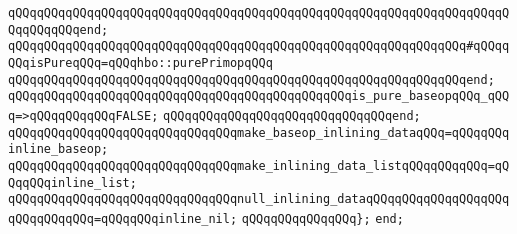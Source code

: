 \verb|qQQqqQQqqQQqqQQqqQQqqQQqqQQqqQQqqQQqqQQqqQQqqQQqqQQqqQQqqQQqqQQqqQQqqQQqqQQqqQQqend;|\newline
\newline
\verb|qQQqqQQqqQQqqQQqqQQqqQQqqQQqqQQqqQQqqQQqqQQqqQQqqQQqqQQqqQQqqQQq#qQQqqQQqisPureqQQq=qQQqhbo::purePrimopqQQq|\newline
\newline
\verb|qQQqqQQqqQQqqQQqqQQqqQQqqQQqqQQqqQQqqQQqqQQqqQQqqQQqqQQqqQQqqQQqend;|\newline
\newline
\verb|qQQqqQQqqQQqqQQqqQQqqQQqqQQqqQQqqQQqqQQqqQQqqQQqis_pure_baseopqQQq_qQQq=>qQQqqQQqqQQqFALSE;|\newline
\verb|qQQqqQQqqQQqqQQqqQQqqQQqqQQqqQQqend;|\newline
\newline
\verb|qQQqqQQqqQQqqQQqqQQqqQQqqQQqqQQqmake_baseop_inlining_dataqQQq=qQQqqQQqinline_baseop;|\newline
\verb|qQQqqQQqqQQqqQQqqQQqqQQqqQQqqQQqmake_inlining_data_listqQQqqQQqqQQq=qQQqqQQqinline_list;|\newline
\verb|qQQqqQQqqQQqqQQqqQQqqQQqqQQqqQQqnull_inlining_dataqQQqqQQqqQQqqQQqqQQqqQQqqQQqqQQq=qQQqqQQqinline_nil;|\newline
\verb|qQQqqQQqqQQqqQQq};|\newline
\verb|end;|\newline

